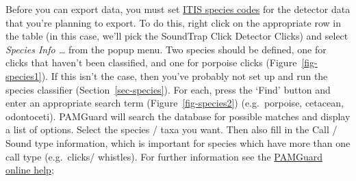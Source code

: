 \documentclass[
]{article}
\begin{document}
Before you can export data, you must set \href{https://itis.gov/}{ITIS
species codes} for the detector data that you're planning to export. To
do this, right click on the appropriate row in the table (in this case,
we'll pick the SoundTrap Click Detector Clicks) and select \emph{Species
Info \ldots{}} from the popup menu. Two species should be defined, one
for clicks that haven't been classified, and one for porpoise clicks
(Figure~\ref{fig-species1}). If this isn't the case, then you've
probably not set up and run the species classifier
(Section~\ref{sec-species}). For each, press the `Find' button and enter
an appropriate search term (Figure~\ref{fig-species2}) (e.g.~porpoise,
cetacean, odontoceti). PAMGuard will search the database for possible
matches and display a list of options. Select the species / taxa you
want. Then also fill in the Call / Sound type information, which is
important for species which have more than one call type (e.g.~clicks/
whistles). For further information see the
\href{https://www.pamguard.org/olhelp/utilities/tethys/docs/tethys_speciescodes.html}{PAMGuard
online help};
\end{document}
